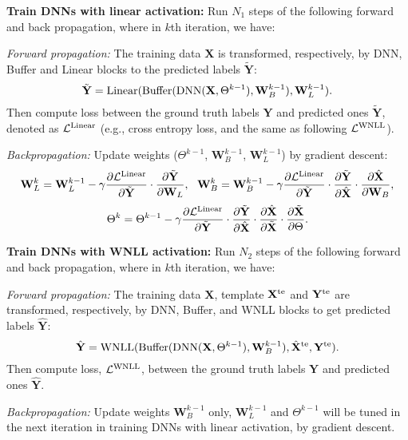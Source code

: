 \documentclass{article}
\newcommand\xmod[1]{{\textcolor{blue}{#1}}}
\begin{document}
{\bf Train DNNs with linear activation: } Run $N_1$ steps of the following forward and back propagation, where in $k$th iteration, we have:

{\it Forward propagation: } The training data $\mathbf{X}$ is transformed, respectively, by DNN, Buffer and Linear blocks to the predicted labels $\tilde{\mathbf{Y}}$:
$$\tilde{\mathbf{Y}} = {\rm Linear}({\rm Buffer}({\rm DNN}(\mathbf{X}, \Theta^{k-1}), \mathbf{W}_B^{k-1}), \mathbf{W}_L^{k-1}).$$
Then compute loss between the ground truth labels $\mathbf{Y}$ and predicted ones $\tilde{\mathbf{Y}}$, denoted as $\mathcal{L}^{\rm Linear}$ (e.g., cross entropy loss, and the same as following $\mathcal{L}^{\rm WNLL}$).

{\it Backpropagation: } Update weights ($\Theta^{k-1}$, $\mathbf{W}_B^{k-1}$, $\mathbf{W}_L^{k-1}$) by gradient descent:
$$
\mathbf{W}_L^k = \mathbf{W}_L^{k-1} - \gamma \frac{\partial \mathcal{L}^{\rm Linear}}{\partial \tilde{\mathbf{Y}}}\cdot \frac{\partial \tilde{\mathbf{Y}}}{\partial \mathbf{W}_L},\ \ \mathbf{W}_B^k = \mathbf{W}_B^{k-1} - \gamma \frac{\partial \mathcal{L}^{\rm Linear}}{\partial \tilde{\mathbf{Y}}}\cdot \frac{\partial \tilde{\mathbf{Y}}}{\partial \hat{\mathbf{X}}}\cdot \frac{\partial \hat{\mathbf{X}}}{\partial \mathbf{W}_B},
$$
$$
\Theta^k = \Theta^{k-1} - \gamma \frac{\partial \mathcal{L}^{\rm Linear}}{\partial \tilde{\mathbf{Y}}}\cdot \frac{\partial \tilde{\mathbf{Y}}}{\partial \hat{\mathbf{X}}}\cdot \frac{\partial \hat{\mathbf{X}}}{\partial \tilde{\mathbf{X}}}\cdot \frac{\partial \tilde{\mathbf{X}}}{\partial \Theta}.
$$


{\bf Train DNNs with WNLL activation: } Run $N_2$ steps of the following forward and back propagation, where in $k$th iteration, we have:

{\it Forward propagation: } The training data $\mathbf{X}$, template $\mathbf{X}^{\rm te}$ and $\mathbf{Y}^{\rm te}$ are transformed, respectively, by DNN, Buffer, and WNLL blocks to get predicted labels $\hat{\mathbf{Y}}$:
$$\hat{\mathbf{Y}} = {\rm WNLL}({\rm Buffer}({\rm DNN}(\mathbf{X}, \Theta^{k-1}), \mathbf{W}_B^{k-1}), \hat{\mathbf{X}}^{\rm te}, \mathbf{Y}^{\rm te}).$$
Then compute loss, $\mathcal{L}^{\rm WNLL}$, between the ground truth labels $\mathbf{Y}$ and predicted ones $\hat{\mathbf{Y}}$.

{\it Backpropagation: } Update weights $\mathbf{W}_B^{k-1}$ only, $\mathbf{W}_L^{k-1}$ and $\Theta^{k-1}$ will be tuned in the next iteration in training DNNs with linear activation, by gradient descent. 
\end{document}
